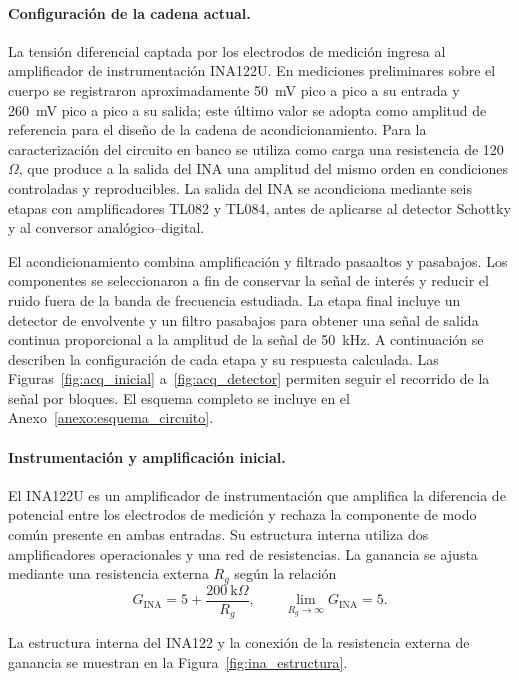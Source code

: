 \documentclass[12pt,a4paper]{article}
\begin{document}
\paragraph{Configuración de la cadena actual.}
La tensión diferencial captada por los electrodos de medición ingresa al amplificador de
instrumentación INA122U. En mediciones preliminares sobre el cuerpo se registraron aproximadamente
50~mV pico a pico a su entrada y 260~mV pico a pico a su salida; este último valor se adopta como
amplitud de referencia para el diseño de la cadena de acondicionamiento. Para la caracterización
del circuito en banco se utiliza como carga una resistencia de 120~$\Omega$, que produce a la
salida del INA una amplitud del mismo orden en condiciones controladas y reproducibles. La salida del INA se acondiciona
mediante seis etapas con amplificadores TL082 y TL084, antes de aplicarse al detector Schottky
y al conversor analógico--digital.

El acondicionamiento combina amplificación y filtrado pasaaltos y pasabajos. Los componentes se seleccionaron a fin 
de conservar la señal de interés y reducir el ruido fuera de la banda de frecuencia estudiada. La etapa final 
incluye un detector de envolvente y un filtro pasabajos para obtener una señal de salida continua proporcional a 
la amplitud de la señal de 50~kHz. A continuación se describen la configuración
de cada etapa y su respuesta calculada. Las Figuras~\ref{fig:acq_inicial}
a~\ref{fig:acq_detector} permiten seguir el recorrido de la señal por bloques. El esquema
completo se incluye en el
Anexo~\ref{anexo:esquema_circuito}.

\paragraph{Instrumentación y amplificación inicial.}
El INA122U es un amplificador de instrumentación que amplifica la diferencia de potencial entre los
electrodos de medición y rechaza la componente de modo común presente en ambas entradas. Su estructura
interna utiliza dos amplificadores operacionales y una red de resistencias. La ganancia se ajusta
mediante una resistencia externa $R_g$ según
la relación \cite{ti_ina122}
\begin{equation}
    G_{\mathrm{INA}}=5+\frac{200~\mathrm{k}\Omega}{R_g},\qquad
    \lim_{R_g\to\infty}G_{\mathrm{INA}}=5.
\end{equation}

La estructura interna del INA122 y la conexión de la resistencia externa de ganancia se muestran en la
Figura~\ref{fig:ina_estructura}.
\end{document}
